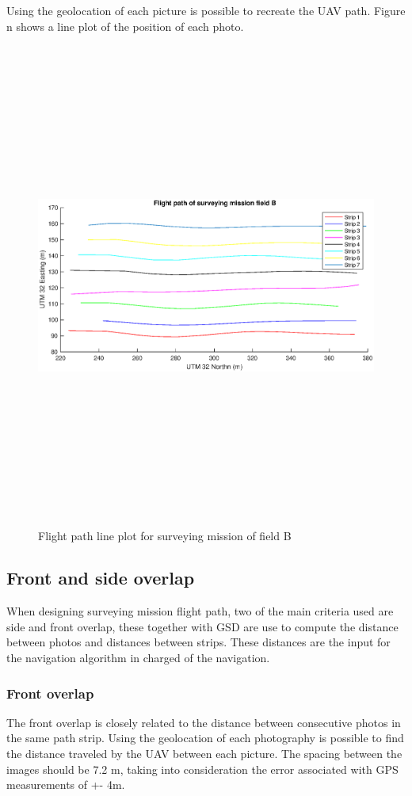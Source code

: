 Using the geolocation of each picture is possible to recreate the UAV path. Figure n shows a line plot of the position of each photo.
\begin{figure}[H]
\centering
\includegraphics[width=16cm,height=16cm,keepaspectratio]{imagenes/graph.eps}
\caption{ Flight path line plot for surveying mission of field B}
\label{fig:FielB}
\end{figure}
\subsection{Front and side overlap}
When designing surveying mission flight path, two of the main criteria used are side and front overlap, these together with GSD are use to compute the distance between photos and distances between strips. These distances are the input for the navigation algorithm in charged of the navigation.
\subsubsection{Front overlap}
The front overlap is closely related to the distance between consecutive photos in the same path strip.  Using the geolocation of each photography is possible to find the distance traveled by the UAV between each picture. The spacing between the images should be 7.2 m, taking into consideration the error associated with GPS measurements of +- 4m. 

